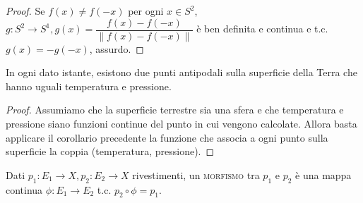 \begin{proof}
  Se $f(x) \not=f(-x)$ per ogni $x \in S^2$, $g:S^2 \rightarrow S^1, g(x)=\dfrac{f(x)-f(-x)}{\|f(x)-f(-x)\|}$ è ben definita e continua e t.c. $g(x)=-g(-x)$, assurdo.
\end{proof}

\begin{cor}
  In ogni dato istante, esistono due punti antipodali sulla superficie della Terra che hanno uguali temperatura e pressione.
\end{cor}

\begin{proof}
  Assumiamo che la superficie terrestre sia una sfera e che temperatura e pressione siano funzioni continue del punto in cui vengono calcolate. Allora basta applicare il corollario precedente la funzione che associa a ogni punto sulla superficie la coppia (temperatura, pressione).
\end{proof}

\begin{defn}
  Dati $p_1:E_1 \rightarrow X, p_2:E_2 \rightarrow X$ rivestimenti, un \textsc{morfismo} tra $p_1$ e $p_2$ è una mappa continua $\phi:E_1 \rightarrow E_2$ t.c. $p_2 \circ \phi=p_1$.
\end{defn}
